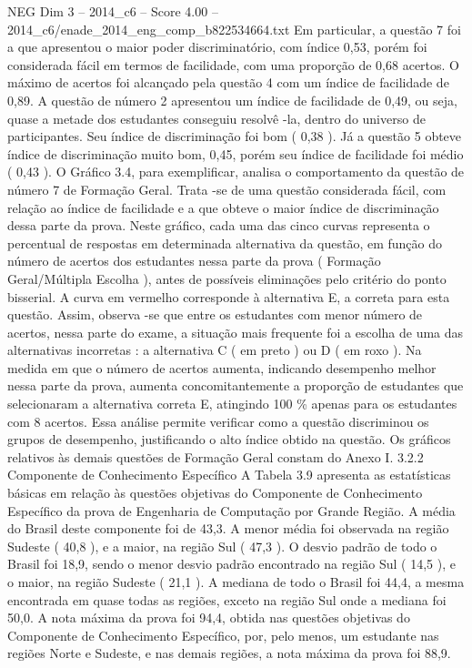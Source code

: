 \begin{textsample}{NEG Dim 3 – 2014\_c6 – Score 4.00 – 2014\_c6/enade\_2014\_eng\_comp\_b822534664.txt}
Em particular, a questão 7 foi a que apresentou o maior poder discriminatório, com índice 0,53, porém foi considerada fácil em termos de facilidade, com uma proporção de 0,68 acertos.
O máximo de acertos foi alcançado pela questão 4 com um índice de facilidade de 0,89.
A questão de número 2 apresentou um índice de facilidade de 0,49, ou seja, quase a metade dos estudantes conseguiu resolvê -la, dentro do universo de participantes.
Seu índice de discriminação foi bom ( 0,38 ).
Já a questão 5 obteve índice de discriminação muito bom, 0,45, porém seu índice de facilidade foi médio ( 0,43 ).
O Gráfico 3.4, para exemplificar, analisa o comportamento da questão de número 7 de Formação Geral.
Trata -se de uma questão considerada fácil, com relação ao índice de facilidade e a que obteve o maior índice de discriminação dessa parte da prova.
Neste gráfico, cada uma das cinco curvas representa o percentual de respostas em determinada alternativa da questão, em função do número de acertos dos estudantes nessa parte da prova ( Formação Geral/Múltipla Escolha ), antes de possíveis eliminações pelo critério do ponto bisserial.
A curva em vermelho corresponde à alternativa E, a correta para esta questão.
Assim, observa -se que entre os estudantes com menor número de acertos, nessa parte do exame, a situação mais frequente foi a escolha de uma das alternativas incorretas : a alternativa C ( em preto ) ou D ( em roxo ).
Na medida em que o número de acertos aumenta, indicando desempenho melhor nessa parte da prova, aumenta concomitantemente a proporção de estudantes que selecionaram a alternativa correta E, atingindo 100 \% apenas para os estudantes com 8 acertos.
Essa análise permite verificar como a questão discriminou os grupos de desempenho, justificando o alto índice obtido na questão.
Os gráficos relativos às demais questões de Formação Geral constam do Anexo I. 3.2.2 Componente de Conhecimento Específico A Tabela 3.9 apresenta as estatísticas básicas em relação às questões objetivas do Componente de Conhecimento Específico da prova de Engenharia de Computação por Grande Região.
A média do Brasil deste componente foi de 43,3.
A menor média foi observada na região Sudeste ( 40,8 ), e a maior, na região Sul ( 47,3 ).
O desvio padrão de todo o Brasil foi 18,9, sendo o menor desvio padrão encontrado na região Sul ( 14,5 ), e o maior, na região Sudeste ( 21,1 ).
A mediana de todo o Brasil foi 44,4, a mesma encontrada em quase todas as regiões, exceto na região Sul onde a mediana foi 50,0.
A nota máxima da prova foi 94,4, obtida nas questões objetivas do Componente de Conhecimento Específico, por, pelo menos, um estudante nas regiões Norte e Sudeste, e nas demais regiões, a nota máxima da prova foi 88,9.

\end{textsample}
